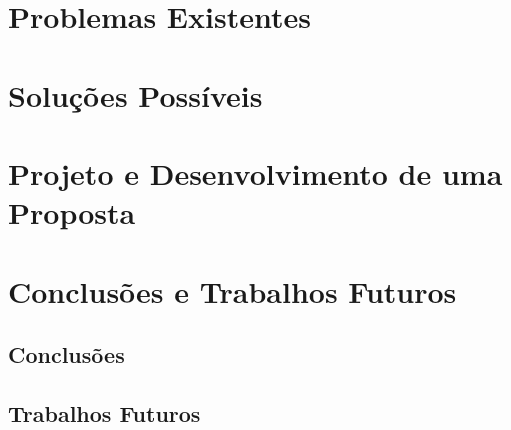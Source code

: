 \documentclass[article]{abntex2}
\begin{document}
\section{Problemas Existentes}
\section{Soluções Possíveis}
\section{Projeto e Desenvolvimento de uma Proposta}
\section{Conclusões e Trabalhos Futuros}
\subsection{Conclusões}
\subsection{Trabalhos Futuros}





\nocite{Auer:2019}
\nocite{Tiburski:2019}
\nocite{Li:2019}
\nocite{Karmakar:2019}
\nocite{Oliveira:2018}
\nocite{Das:2018}
\nocite{Alphand:2018}
\nocite{Novo:2018}
\nocite{Stergiou:2017}
\nocite{Minoli:2017}
\end{document}
